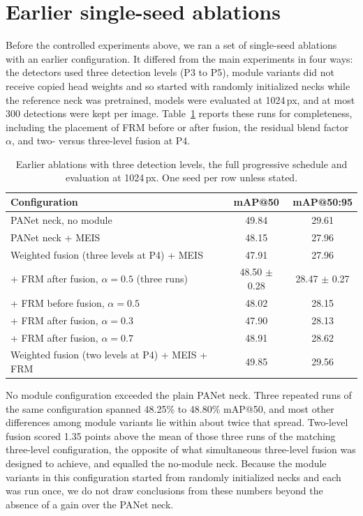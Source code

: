 \documentclass[preprint,12pt]{elsarticle}
\begin{document}
\section{Earlier single-seed ablations}
\label{app:early}

Before the controlled experiments above, we ran a set of single-seed ablations
with an earlier configuration. It differed from the main experiments in four ways:
the detectors used three detection levels (P3 to P5), module variants did not
receive copied head weights and so started with randomly initialized necks while
the reference neck was pretrained, models were evaluated at 1024\,px, and at most
300 detections were kept per image. Table~\ref{tab:early} reports these runs for
completeness, including the placement of FRM before or after fusion, the residual
blend factor $\alpha$, and two- versus three-level fusion at P4.

\begin{table}[t]
\centering
\caption{Earlier ablations with three detection levels, the full progressive
schedule and evaluation at 1024\,px. One seed per row unless stated.}
\label{tab:early}
\small
\begin{tabular}{lcc}
\toprule
Configuration & mAP@50 & mAP@50:95 \\
\midrule
PANet neck, no module                                    & 49.84 & 29.61 \\
PANet neck + MEIS                                        & 48.15 & 27.96 \\
Weighted fusion (three levels at P4) + MEIS              & 47.91 & 27.96 \\
\quad + FRM after fusion, $\alpha=0.5$ (three runs)      & 48.50 $\pm$ 0.28 & 28.47 $\pm$ 0.27 \\
\quad + FRM before fusion, $\alpha=0.5$                  & 48.02 & 28.15 \\
\quad + FRM after fusion, $\alpha=0.3$                   & 47.90 & 28.13 \\
\quad + FRM after fusion, $\alpha=0.7$                   & 48.91 & 28.62 \\
Weighted fusion (two levels at P4) + MEIS + FRM          & 49.85 & 29.56 \\
\bottomrule
\end{tabular}
\end{table}

No module configuration exceeded the plain PANet neck. Three repeated runs of the
same configuration spanned 48.25\% to 48.80\% mAP@50, and most other differences
among module variants lie within about twice that spread. Two-level fusion scored
1.35 points above the mean of those three runs of the matching three-level
configuration, the opposite of what simultaneous three-level fusion was designed
to achieve, and equalled the no-module neck. Because the module variants in this configuration started from
randomly initialized necks and each was run once, we do not draw conclusions from
these numbers beyond the absence of a gain over the PANet neck.



\end{document}
